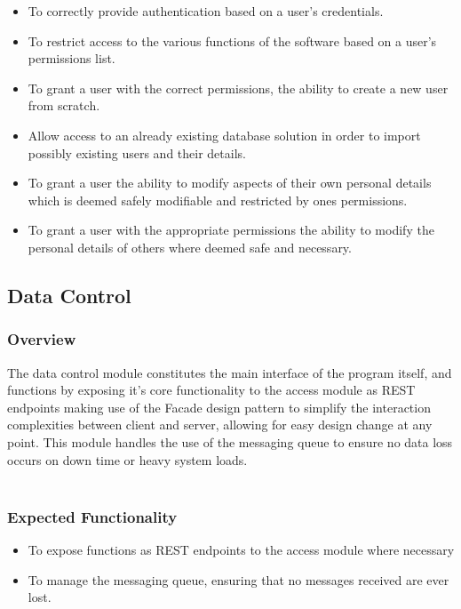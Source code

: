 \documentclass[12pt]{article}
\begin{document}
		\begin{itemize}
			\item To correctly provide authentication based on a user's credentials.
			\item To restrict access to the various functions of the software based on a user's permissions list.
			\item To grant a user with the correct permissions, the ability to create a new user from scratch.
			\item Allow access to an already existing database solution in order to import possibly existing users and their details.
			\item To grant a user the ability to modify aspects of their own personal details which is deemed safely modifiable and restricted by ones permissions.
			\item To grant a user with the appropriate permissions the ability to modify the personal details of others where deemed safe and necessary.
			
		\end{itemize}
	
	\pagebreak
	
	\subsection{Data Control}
	
		\subsubsection{Overview}
		
		The data control module constitutes the main interface of the program itself, and functions by exposing it's core functionality to the access module as REST endpoints making use of the Facade design pattern to simplify the interaction complexities between client and server, allowing for easy design change at any point. This module handles the use of the messaging queue to ensure no data loss occurs on down time or heavy system loads.\\\\
		
		\subsubsection{Expected Functionality}
		
		\begin{itemize}
			\item To expose functions as REST endpoints to the access module where necessary
			\item To manage the messaging queue, ensuring that no messages received are ever lost.
		\end{itemize}
	
\end{document}
